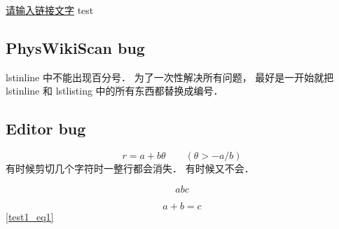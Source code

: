 

\href{http://www.example.com}{请输入链接文字}
test
\subsection{PhysWikiScan bug}
lstinline 中不能出现百分号． 为了一次性解决所有问题， 最好是一开始就把 lstinline 和 lstlisting 中的所有东西都替换成编号．

\subsection{Editor bug}
\begin{equation}
r = a + b\theta \qquad (\theta > -a/b)
\end{equation}
有时候剪切几个字符时一整行都会消失． 有时候又不会．

\begin{equation}
abc
\end{equation}

\begin{equation}\label{test1_eq1}
a + b = c
\end{equation}
\autoref{test1_eq1}
